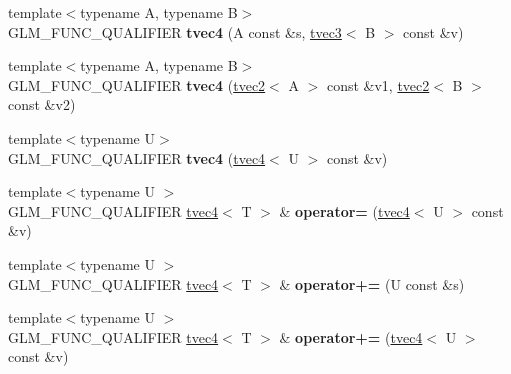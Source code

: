 \begin{DoxyCompactItemize}
\item 
\hypertarget{structglm_1_1detail_1_1tvec4_ab768b94837de8cd853d4e4f0238556bd}{{\footnotesize template$<$typename A, typename B$>$ }\\G\-L\-M\-\_\-\-F\-U\-N\-C\-\_\-\-Q\-U\-A\-L\-I\-F\-I\-E\-R {\bfseries tvec4} (A const \&s, \hyperlink{structglm_1_1detail_1_1tvec3}{tvec3}$<$ B $>$ const \&v)}\label{structglm_1_1detail_1_1tvec4_ab768b94837de8cd853d4e4f0238556bd}

\item 
\hypertarget{structglm_1_1detail_1_1tvec4_aa6fe58d14fcd72305a7290873d6ebebc}{{\footnotesize template$<$typename A, typename B$>$ }\\G\-L\-M\-\_\-\-F\-U\-N\-C\-\_\-\-Q\-U\-A\-L\-I\-F\-I\-E\-R {\bfseries tvec4} (\hyperlink{structglm_1_1detail_1_1tvec2}{tvec2}$<$ A $>$ const \&v1, \hyperlink{structglm_1_1detail_1_1tvec2}{tvec2}$<$ B $>$ const \&v2)}\label{structglm_1_1detail_1_1tvec4_aa6fe58d14fcd72305a7290873d6ebebc}

\item 
\hypertarget{structglm_1_1detail_1_1tvec4_a36df281e0c88fd525d62f430e3b97313}{{\footnotesize template$<$typename U$>$ }\\G\-L\-M\-\_\-\-F\-U\-N\-C\-\_\-\-Q\-U\-A\-L\-I\-F\-I\-E\-R {\bfseries tvec4} (\hyperlink{structglm_1_1detail_1_1tvec4}{tvec4}$<$ U $>$ const \&v)}\label{structglm_1_1detail_1_1tvec4_a36df281e0c88fd525d62f430e3b97313}

\item 
\hypertarget{structglm_1_1detail_1_1tvec4_a57308ff4746163029ec4410504ef721a}{{\footnotesize template$<$typename U $>$ }\\G\-L\-M\-\_\-\-F\-U\-N\-C\-\_\-\-Q\-U\-A\-L\-I\-F\-I\-E\-R \hyperlink{structglm_1_1detail_1_1tvec4}{tvec4}$<$ T $>$ \& {\bfseries operator=} (\hyperlink{structglm_1_1detail_1_1tvec4}{tvec4}$<$ U $>$ const \&v)}\label{structglm_1_1detail_1_1tvec4_a57308ff4746163029ec4410504ef721a}

\item 
\hypertarget{structglm_1_1detail_1_1tvec4_a47c1d3e36062a1b834f21627a8ee2f23}{{\footnotesize template$<$typename U $>$ }\\G\-L\-M\-\_\-\-F\-U\-N\-C\-\_\-\-Q\-U\-A\-L\-I\-F\-I\-E\-R \hyperlink{structglm_1_1detail_1_1tvec4}{tvec4}$<$ T $>$ \& {\bfseries operator+=} (U const \&s)}\label{structglm_1_1detail_1_1tvec4_a47c1d3e36062a1b834f21627a8ee2f23}

\item 
\hypertarget{structglm_1_1detail_1_1tvec4_a95cdab0975bd4ec8673c96ed10797a4a}{{\footnotesize template$<$typename U $>$ }\\G\-L\-M\-\_\-\-F\-U\-N\-C\-\_\-\-Q\-U\-A\-L\-I\-F\-I\-E\-R \hyperlink{structglm_1_1detail_1_1tvec4}{tvec4}$<$ T $>$ \& {\bfseries operator+=} (\hyperlink{structglm_1_1detail_1_1tvec4}{tvec4}$<$ U $>$ const \&v)}\label{structglm_1_1detail_1_1tvec4_a95cdab0975bd4ec8673c96ed10797a4a}


\end{DoxyCompactItemize}
